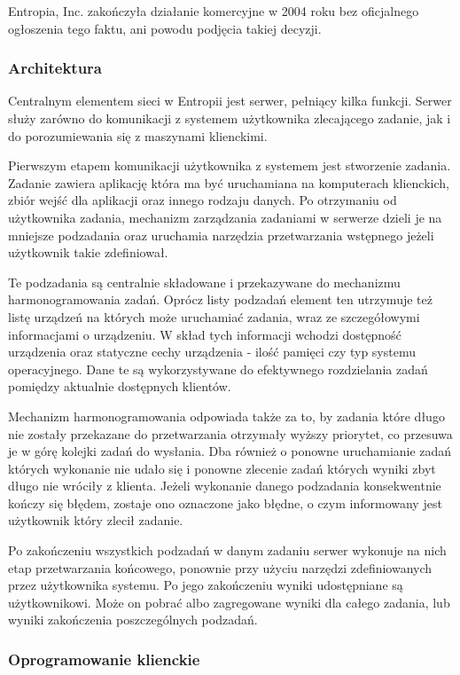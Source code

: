 \documentclass[12pt,a4paper,twoside]{article}
\begin{document}
Entropia, Inc. zakończyła działanie komercyjne w 2004 roku bez oficjalnego ogłoszenia tego faktu, ani powodu podjęcia takiej decyzji.

\subsubsection{Architektura}

Centralnym elementem sieci w Entropii jest serwer, pełniący kilka funkcji. Serwer służy zarówno do komunikacji z systemem użytkownika zlecającego zadanie, jak i do porozumiewania się z maszynami klienckimi.

Pierwszym etapem komunikacji użytkownika z systemem jest stworzenie zadania. Zadanie zawiera aplikację która ma być uruchamiana na komputerach klienckich, zbiór wejść dla aplikacji oraz innego rodzaju danych. Po otrzymaniu od użytkownika zadania, mechanizm zarządzania zadaniami w serwerze dzieli je na mniejsze podzadania oraz uruchamia narzędzia przetwarzania wstępnego jeżeli użytkownik takie zdefiniował. 

Te podzadania są centralnie składowane i przekazywane do mechanizmu harmonogramowania zadań. Oprócz listy podzadań element ten utrzymuje też listę urządzeń na których może uruchamiać zadania, wraz ze szczegółowymi informacjami o urządzeniu. W skład tych informacji wchodzi dostępność urządzenia oraz statyczne cechy urządzenia - ilość pamięci czy typ systemu operacyjnego. Dane te są wykorzystywane do efektywnego rozdzielania zadań pomiędzy aktualnie dostępnych klientów.

Mechanizm harmonogramowania odpowiada także za to, by zadania które długo nie zostały przekazane do przetwarzania otrzymały wyższy priorytet, co przesuwa je w górę kolejki zadań do wysłania. Dba również o ponowne uruchamianie zadań których wykonanie nie udało się i ponowne zlecenie zadań których wyniki zbyt długo nie wróciły z klienta. Jeżeli wykonanie danego podzadania konsekwentnie kończy się błędem, zostaje ono oznaczone jako błędne, o czym informowany jest użytkownik który zlecił zadanie.

Po zakończeniu wszystkich podzadań w danym zadaniu serwer wykonuje na nich etap przetwarzania końcowego, ponownie przy użyciu narzędzi zdefiniowanych przez użytkownika systemu. Po jego zakończeniu wyniki udostępniane są użytkownikowi. Może on pobrać albo zagregowane wyniki dla całego zadania, lub wyniki zakończenia poszczególnych podzadań.

\subsubsection{Oprogramowanie klienckie}
\end{document}
